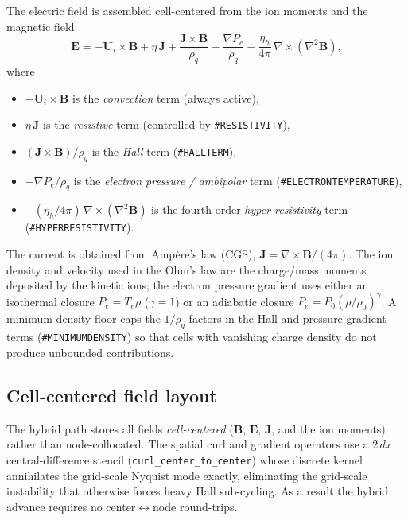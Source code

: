 \documentclass[a4paper, 11pt]{article}
\begin{document}
The electric field is assembled cell-centered from the ion moments and the magnetic field:
\begin{equation}
\mathbf{E} = -\mathbf{U}_i \times \mathbf{B}
           + \eta\,\mathbf{J}
           + \frac{\mathbf{J} \times \mathbf{B}}{\rho_q}
           - \frac{\nabla P_e}{\rho_q}
           - \frac{\eta_h}{4\pi}\,\nabla \times (\nabla^2 \mathbf{B}),
\label{eq:ohmslaw}
\end{equation}
where
\begin{itemize}
  \item $-\mathbf{U}_i \times \mathbf{B}$ is the \emph{convection} term (always active),
  \item $\eta\,\mathbf{J}$ is the \emph{resistive} term (controlled by \texttt{\#RESISTIVITY}),
  \item $(\mathbf{J}\times\mathbf{B})/\rho_q$ is the \emph{Hall} term (\texttt{\#HALLTERM}),
  \item $-\nabla P_e/\rho_q$ is the \emph{electron pressure / ambipolar} term
        (\texttt{\#ELECTRONTEMPERATURE}),
  \item $-(\eta_h/4\pi)\,\nabla\times(\nabla^2\mathbf{B})$ is the fourth-order
        \emph{hyper-resistivity} term (\texttt{\#HYPERRESISTIVITY}).
\end{itemize}
The current is obtained from Amp\`ere's law (CGS), $\mathbf{J} = \nabla\times\mathbf{B}/(4\pi)$.
The ion density and velocity used in the Ohm's law are the charge/mass moments deposited by the
kinetic ions; the electron pressure gradient uses either an isothermal closure
$P_e = T_e \rho$ ($\gamma=1$) or an adiabatic closure
$P_e = P_0(\rho/\rho_0)^\gamma$. A minimum-density floor caps the $1/\rho_q$ factors in the
Hall and pressure-gradient terms (\texttt{\#MINIMUMDENSITY}) so that cells with vanishing charge
density do not produce unbounded contributions.

\subsection{Cell-centered field layout}

The hybrid path stores all fields \emph{cell-centered} ($\mathbf{B}$, $\mathbf{E}$, $\mathbf{J}$,
and the ion moments) rather than node-collocated. The spatial curl and gradient operators use a
$2\,dx$ central-difference stencil (\texttt{curl\_center\_to\_center}) whose discrete kernel
annihilates the grid-scale Nyquist mode exactly, eliminating the grid-scale instability that
otherwise forces heavy Hall sub-cycling. As a result the hybrid advance requires no
center$\leftrightarrow$node round-trips.
\end{document}
